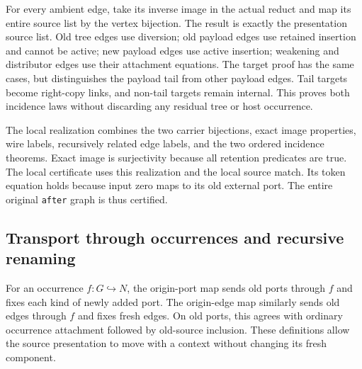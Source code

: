 

For every ambient edge, take its inverse image in the actual reduct and map
its entire source list by the vertex bijection. The result is exactly the
presentation source list. Old tree edges use diversion; old payload edges
use retained insertion and cannot be active; new payload edges use active
insertion; weakening and distributor edges use their attachment equations.
The target proof has the same cases, but distinguishes the payload tail from
other payload edges. Tail targets become right-copy links, and non-tail
targets remain internal. This proves both incidence laws without discarding
any residual tree or host occurrence.



The local realization combines the two carrier bijections, exact image
properties, wire labels, recursively related edge labels, and the two ordered
incidence theorems. Exact image is surjectivity because all retention predicates
are true. The local certificate uses this realization and the local source
match. Its token equation holds because input zero maps to its old external
port. The entire original \texttt{after} graph is thus certified.



\subsection{Transport through occurrences and recursive renaming}

For an occurrence $f:G\hookrightarrow N$, the origin-port map sends old
ports through $f$ and fixes each kind of newly added port. The origin-edge map
similarly sends old edges through $f$ and fixes fresh edges. On old ports,
this agrees with ordinary occurrence attachment followed by old-source
inclusion. These definitions allow the source presentation to move with a
context without changing its fresh component.


